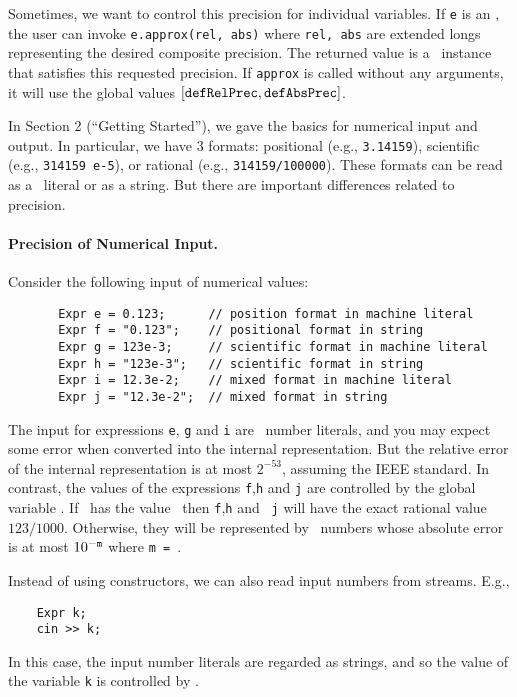 \documentclass[12pt]{article}
\begin{document}
Sometimes, we want to control this precision for individual
variables.  If {\tt e} is an \expr, the user can invoke 
{\tt e.approx(rel, abs)} where {\tt rel, abs} are
extended longs representing the desired composite precision.
The returned value is a \real\ instance that satisfies this requested
precision.
If {\tt approx} is called without any arguments, it will
use the global values $[\mbox{\tt defRelPrec},\mbox{\tt defAbsPrec}]$.

In Section 2 (``Getting Started''),
we gave the basics for numerical input and output.
In particular, we have 3 formats:
positional (e.g., {\tt 3.14159}),
scientific (e.g., {\tt 314159 e-5}), or
rational (e.g., {\tt 314159/100000}).
These formats can be read as a \cpp\ literal or as a string.
But there are important differences related to precision.

\paragraph{Precision of Numerical Input.}
Consider the following input of numerical values:

   \begin{verbatim}
       Expr e = 0.123;      // position format in machine literal
       Expr f = "0.123";    // positional format in string
       Expr g = 123e-3;     // scientific format in machine literal
       Expr h = "123e-3";   // scientific format in string
       Expr i = 12.3e-2;    // mixed format in machine literal
       Expr j = "12.3e-2";  // mixed format in string
   \end{verbatim}
   
The input for expressions \texttt{e}, \texttt{g} and \texttt{i}
are \cpp\ number literals, and you may
expect some error when converted into the internal representation.
But the relative error of the internal representation is at most
$2^{-53}$, assuming the IEEE standard.  
In contrast, the values of the expressions
\texttt{f},\texttt{h} and \texttt{j}
are controlled by the global variable .
If \ has the value \coreInfty\ then
\texttt{f},\texttt{h} and \texttt{ j}
will have the exact rational value $123/1000$.
Otherwise, they will be
represented by \BF\ numbers whose absolute error is
at most $10^{- \tt m}$ where {\tt m = }.

Instead of using constructors, we can also read input
numbers from streams.  E.g.,
	\begin{verbatim}
	Expr k;
	cin >> k;
	\end{verbatim}
In this case, the input number literals are regarded as strings,
and so the value of the variable \texttt{k} is controlled by .
\end{document}
